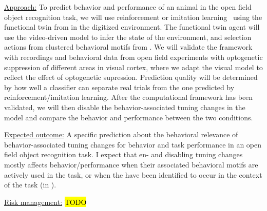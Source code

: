 \documentclass[COG,11pt]{ercgrant}
\begin{document}
\underline{Approach:} 
To predict behavior and performance of an animal in the open field object recognition task, we will use reinforcement or imitation learning~\parencite{Chen2021-ap} using the functional twin from  in the digitized environment. 
The functional twin agent will use the video-driven model to infer the state of the environment, and selection actions from clustered behavioral motifs from . 
We will validate the framework with recordings and behavioral data from open field experiments with optogenetic suppression of different areas in visual cortex, where we adapt the visual model to reflect the effect of optogenetic supression. 
Prediction quality will be determined by how well a classifier can separate real trials from the one predicted by reinforcement/imitation learning. 
After the computational framework has been validated, we will then disable the behavior-associated tuning changes in the model and compare the behavior and performance between the two conditions.


\underline{Expected outcome:} A specific prediction about the behavioral relevance of behavior-associated tuning changes for behavior and task performance in  an open field object recognition task. 
I expect that en- and disabling tuning changes mostly affects behavior/performance when their associated behavioral motifs are actively used in the task, or when the have been identified to occur in the context of the task (in ).

\underline{Risk management:} \hl{TODO}


\begin{small}
\printbibliography
\end{small}
\end{document}
